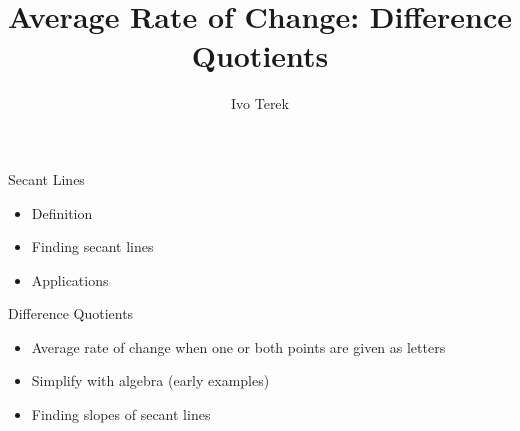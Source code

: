 \documentclass{ximera}
\author{Ivo Terek}
\title{Average Rate of Change: Difference Quotients}
\begin{document}
\begin{abstract}
\end{abstract}
\maketitle


\begin{objectives}

\item Secant Lines
\begin{itemize}
	\item Definition
        \item Finding secant lines
        \item Applications
\end{itemize}

\item Difference Quotients

  \begin{itemize}
  \item Average rate of change when one or both points are given as letters
  \item Simplify with algebra (early examples)
  \item Finding slopes of secant lines
  \end{itemize}

\end{objectives}
\end{document}
